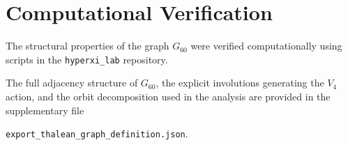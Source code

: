 \section{Computational Verification}

The structural properties of the graph $G_{60}$ were verified
computationally using scripts in the \texttt{hyperxi\_lab} repository.

The full adjacency structure of $G_{60}$, the explicit involutions
generating the $V_4$ action, and the orbit decomposition used in the
analysis are provided in the supplementary file

\texttt{export_thalean_graph_definition.json}.

